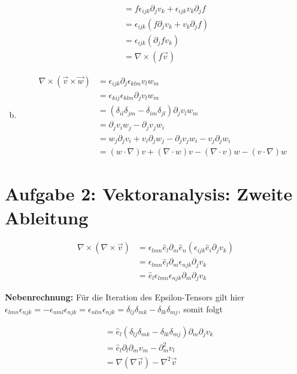 \documentclass[a4paper,german,12pt,smallheadings]{scrartcl}
\begin{document}
\begin{enumerate}[a)]
\begin{align*}
      &= f \epsilon_{ijk} \partial_j v_k + \epsilon_{ijk} v_k \partial_j f \\
      &= \epsilon_{ijk} (f \partial_j v_k + v_k \partial_j f) \\
      &= \epsilon_{ijk} (\partial_j f v_k) \\
      &= \nabla \times (f \vec{v})
    \end{align*}
  \item
    \begin{align*}
      \nabla \times (\vec{v} \times \vec{w})
       &= \epsilon_{ijk} \partial_j \epsilon_{klm} v_l w_m \\
       &= \epsilon_{kij} \epsilon_{klm} \partial_j v_l w_m \\
       &= (\delta_{il} \delta_{jm} - \delta_{im} \delta_{jl}) \partial_j v_l w_m \\
       &= \partial_j v_i w_j - \partial_j v_j w_i \\
       &= w_j \partial_j v_i + v_i \partial_j w_j - \partial_j v_j w_i - v_j \partial_j w_i \\
       &= (w \cdot \nabla) v + (\nabla \cdot w) v - (\nabla \cdot v) w - (v \cdot \nabla) w
    \end{align*}
\end{enumerate}

\section*{Aufgabe 2: Vektoranalysis: Zweite Ableitung}

\begin{align*}
     \nabla \times (\nabla \times \vec{v})
     &= \epsilon_{lmn} \hat{e}_l \partial_m \hat{e}_n (\epsilon_{ijk} \hat{e}_i \partial_j v_k) \\
     &= \epsilon_{lmn} \hat{e}_l \partial_m \epsilon_{njk} \partial_j v_k \\
     &= \hat{e}_l \epsilon_{lmn} \epsilon_{njk} \partial_m \partial_j v_k
\end{align*}

\textbf{Nebenrechnung:} Für die Iteration des Epsilon-Tensors gilt hier $
  \epsilon_{lmn} \epsilon_{njk} = -\epsilon_{nml} \epsilon_{njk}
  = \epsilon_{nlm} \epsilon_{njk}
  = \delta_{lj}\delta_{mk} - \delta_{lk}\delta_{mj}
$, somit folgt

\begin{align*}
  &= \hat{e}_l (\delta_{lj}\delta_{mk} - \delta_{lk}\delta_{mj}) \partial_m \partial_j v_k \\
  &= \hat{e}_l \partial_l \partial_m v_m - \partial_m^2 v_l \\
  &= \nabla(\nabla \vec{v}) - \nabla^2 \vec{v}
\end{align*}
\end{document}
